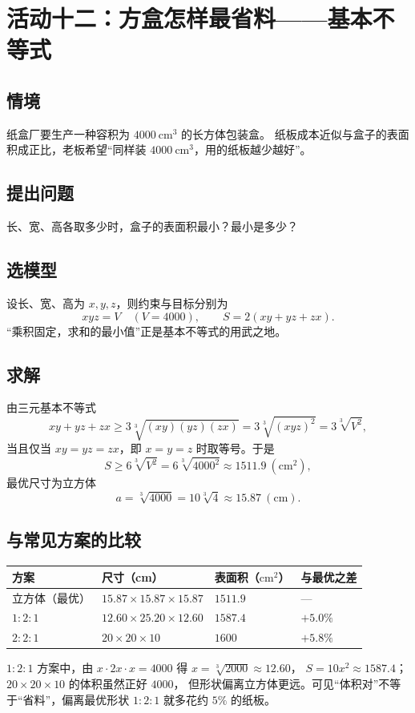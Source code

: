 \section{活动十二：方盒怎样最省料——基本不等式}

\subsection{情境}
纸盒厂要生产一种容积为 $4000\ \mathrm{cm^3}$ 的长方体包装盒。
纸板成本近似与盒子的表面积成正比，老板希望“同样装 $4000\ \mathrm{cm^3}$，用的纸板越少越好”。

\subsection{提出问题}
长、宽、高各取多少时，盒子的表面积最小？最小是多少？

\subsection{选模型}
设长、宽、高为 $x,y,z$，则约束与目标分别为
\[
  xyz=V\quad(V=4000),\qquad S=2(xy+yz+zx).
\]
“乘积固定，求和的最小值”正是基本不等式的用武之地。

\subsection{求解}
由三元基本不等式
\[
  xy+yz+zx\ge 3\sqrt[3]{(xy)(yz)(zx)}=3\sqrt[3]{(xyz)^2}=3\sqrt[3]{V^2},
\]
当且仅当 $xy=yz=zx$，即 $x=y=z$ 时取等号。于是
\[
  S\ge 6\sqrt[3]{V^2}=6\sqrt[3]{4000^2}\approx 1511.9\ (\mathrm{cm^2}),
\]
最优尺寸为立方体
\[
  a=\sqrt[3]{4000}=10\sqrt[3]{4}\approx 15.87\ (\mathrm{cm}).
\]

\subsection{与常见方案的比较}
\begin{center}
\footnotesize
\setlength{\tabcolsep}{6pt}
\renewcommand{\arraystretch}{1.4}
\begin{tabular}{p{3.2cm}p{4.6cm}p{3.0cm}p{2.4cm}}
\toprule
方案 & 尺寸（cm） & 表面积（$\mathrm{cm^2}$） & 与最优之差 \\
\midrule
立方体（最优） & $15.87\times15.87\times15.87$ & $1511.9$ & — \\
$1:2:1$ & $12.60\times25.20\times12.60$ & $1587.4$ & $+5.0\%$ \\
$2:2:1$ & $20\times20\times10$ & $1600$ & $+5.8\%$ \\
\bottomrule
\end{tabular}
\end{center}
$1:2:1$ 方案中，由 $x\cdot 2x\cdot x=4000$ 得 $x=\sqrt[3]{2000}\approx12.60$，
$S=10x^2\approx1587.4$；$20\times20\times10$ 的体积虽然正好 $4000$，
但形状偏离立方体更远。可见“体积对”不等于“省料”，偏离最优形状 $1:2:1$
就多花约 $5\%$ 的纸板。

